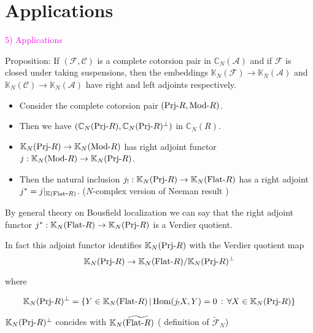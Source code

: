 \documentclass[t,ignorenonframetext]{beamer}
\newcommand{\CA}{\mathcal{A} }
\newcommand{\CC}{\mathcal{C} }
\newcommand{\CF}{\mathcal{F} }
\newcommand{\C}{\mathbb{C} }
\newcommand{\K}{\mathbb{K} }
\newcommand{\Mod}{{\rm{Mod}} \mbox{-}}
\newcommand{\Prj}{{\rm Prj} \mbox{-}}
\newcommand{\Flat}{{\rm Flat} \mbox{-}}
\newcommand{\Hom}{{\rm{Hom}}}
\begin{document}
\section{Applications}

\begin{frame}{\textcolor{magenta}{5) Applications }}
\begin{block}{Proposition:}
If $(\CF,\CC)$ is a complete cotorsion pair in $\C_N(\CA)$ and if $\CF$ is closed under taking suspensions, then the embeddings $\K_N(\CF)\rightarrow \K_N(\CA)$ and $\K_N(\CC)\rightarrow \K_N(\CA)$ have right and left adjoints respectively.
\end{block}
\pause

\vspace{0.3cm}
\begin{itemize}
\item Consider the complete cotorsion pair $(\Prj R, \Mod R)$.
\pause
\item Then we have $(\C_N(\Prj R), \C_N(\Prj R)^\perp)$ in $\C_N(R)$.
\pause
\item $\K_N(\Prj R)\rightarrow \K_N(\Mod R)$ has right adjoint functor $j:\K_N(\Mod R)\rightarrow \K_N(\Prj R)$.
\pause
\item Then the natural inclusion $j_{!}:\K_N(\Prj R)\rightarrow \K_N(\Flat R)$ has a right adjoint $j^\ast=j|_{\K(\Flat R)}$. ($N$-complex version of Neeman result \cite[Proposition 8.1]{Neeman1})
\end{itemize}
 



\end{frame}

\begin{frame}
By general theory on Bousfield localization we can say that the right adjoint functor $j^\ast:\K_N(\Flat R)\rightarrow \K_N(\Prj R)$ is a Verdier quotient. 

\pause
In fact this adjoint functor identifies $\K_N(\Prj R)$ with the Verdier quotient map
$$\K_N(\Prj R)\rightarrow \K_N(\Flat R)/\K_N(\Prj R)^\perp$$

\pause
where \begin{small}
$$\K_N(\Prj R)^\perp=\lbrace Y\in \K_N(\Flat R)\, | \, \Hom(j_{!}X,Y)=0\,:\, \forall X\in \K_N(\Prj R)\rbrace$$
\end{small}
 
\pause

\vspace{0.3cm}
$\K_N(\Prj R)^\perp$ concides with $\K_N(\widetilde{\Flat R})$ ( definition of $\widetilde{\CF}_N$)
\end{frame}
\end{document}
